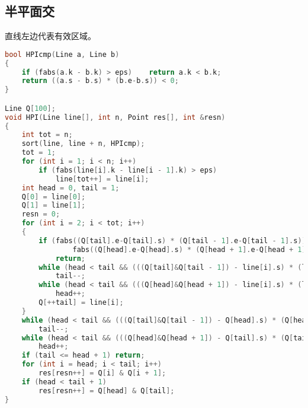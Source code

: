 \subsection{半平面交}
    直线左边代表有效区域。
    \begin{lstlisting}[language=c++]
bool HPIcmp(Line a, Line b)
{
    if (fabs(a.k - b.k) > eps)    return a.k < b.k;
    return ((a.s - b.s) * (b.e-b.s)) < 0;
}

Line Q[100];
void HPI(Line line[], int n, Point res[], int &resn)
{
    int tot = n;
    sort(line, line + n, HPIcmp);
    tot = 1;
    for (int i = 1; i < n; i++)
        if (fabs(line[i].k - line[i - 1].k) > eps)
            line[tot++] = line[i];
    int head = 0, tail = 1;
    Q[0] = line[0];
    Q[1] = line[1];
    resn = 0;
    for (int i = 2; i < tot; i++)
    {
        if (fabs((Q[tail].e-Q[tail].s) * (Q[tail - 1].e-Q[tail - 1].s)) < eps ||
                fabs((Q[head].e-Q[head].s) * (Q[head + 1].e-Q[head + 1].s)) < eps)
            return;
        while (head < tail && (((Q[tail]&Q[tail - 1]) - line[i].s) * (line[i].e-line[i].s)) > eps)
            tail--;
        while (head < tail && (((Q[head]&Q[head + 1]) - line[i].s) * (line[i].e-line[i].s)) > eps)
            head++;
        Q[++tail] = line[i];
    }
    while (head < tail && (((Q[tail]&Q[tail - 1]) - Q[head].s) * (Q[head].e-Q[head].s)) > eps)
        tail--;
    while (head < tail && (((Q[head]&Q[head + 1]) - Q[tail].s) * (Q[tail].e-Q[tail].s)) > eps)
        head++;
    if (tail <= head + 1) return;
    for (int i = head; i < tail; i++)
        res[resn++] = Q[i] & Q[i + 1];
    if (head < tail + 1)
        res[resn++] = Q[head] & Q[tail];
}
    \end{lstlisting}
